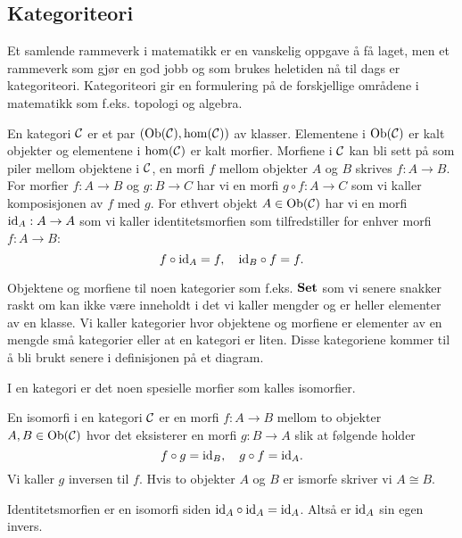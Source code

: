 \subsection{Kategoriteori}\label{Sec:Katgoriteori}
Et samlende rammeverk i matematikk er en vanskelig oppgave å få laget, men et rammeverk som gjør en god jobb og som brukes heletiden nå til dags er kategoriteori. Kategoriteori gir en formulering på de forskjellige områdene i matematikk som f.eks. topologi og algebra.

\begin{definisjon}\label{Def:Kategori}
    En kategori $\mathcal{C}$ er et par $(\textnormal{Ob}(\mathcal{C}),\hom(\mathcal{C}))$ av klasser. Elementene i $\textnormal{Ob}(\mathcal{C})$ er kalt objekter og elementene i $\hom(\mathcal{C})$ er kalt morfier. Morfiene i $\mathcal{C}$ kan bli sett på som piler mellom objektene i $\mathcal{C}$, en morfi $f$ mellom objekter $A$ og $B$ skrives $f:A\to B$.
    For morfier $f: A\to B$ og $g: B\to C$ har vi en morfi $g\circ f: A\to C$ som vi kaller komposisjonen av $f$ med $g$.
    For ethvert objekt $A\in\textnormal{Ob}(\mathcal{C})$ har vi en morfi $\textnormal{id}_A: A\to A$ som vi kaller identitetsmorfien som tilfredstiller for enhver morfi $f:A\to B$:
    \[f\circ\textnormal{id}_A = f,\quad \textnormal{id}_B\circ f = f.\]
\end{definisjon}

\begin{bemerk}\label{rem:smaakat}
  Objektene og morfiene til noen kategorier som f.eks. $\textnormal{\textbf{Set}}$ som
  vi senere snakker raskt om kan ikke være inneholdt i det vi
  kaller mengder og er heller elementer av en klasse. Vi kaller
  kategorier hvor objektene og morfiene er elementer av en mengde
  små kategorier eller at en kategori er liten. Disse kategoriene kommer til å bli brukt senere i definisjonen på et diagram.
\end{bemerk}

I en kategori er det noen spesielle morfier som kalles isomorfier.
\begin{definisjon}\label{Def:Iso}
    En isomorfi i en kategori $\mathcal{C}$ er en morfi $f:A\to B$ mellom to objekter $A,B\in\textnormal{Ob}(\mathcal{C})$ hvor det eksisterer en morfi $g:B\to A$ slik at følgende holder
    \[f\circ g = \textnormal{id}_B,\quad g\circ f = \textnormal{id}_A.\]
    Vi kaller $g$ inversen til $f$. Hvis to objekter $A$ og $B$ er ismorfe skriver vi $A\cong B$.
\end{definisjon}

\begin{bemerk}\label{Rem:IdIso}
    Identitetsmorfien er en isomorfi siden $\textnormal{id}_A\circ\textnormal{id}_A = \textnormal{id}_A$. Altså er $\textnormal{id}_A$ sin egen invers.
\end{bemerk}

